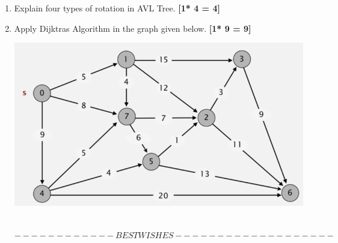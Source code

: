 \documentclass[12pt,a4paper]{article}
\begin{document}
\begin{enumerate}
\begin{center}
    		\label{fig:screenshot-2020-12-13-at-3}
    	\end{center}
		 \pagebreak
	\item Explain four types of rotation in AVL Tree. \hfill \textbf{[1* 4 = 4]}
	\item Apply Dijktras Algorithm in the graph given below.  \hfill \textbf{[1* 9 = 9]}
	\begin{center}
		\centering
		\includegraphics[width=1\linewidth]{"Screenshot 2020-12-13 at 3.40.03 PM"}
		\label{fig:screenshot-2020-12-13-at-3}
	\end{center}
    \\
   	\vspace{1cm}
    $------------BEST WISHES-------------------$
	\end{enumerate}
\end{document}
